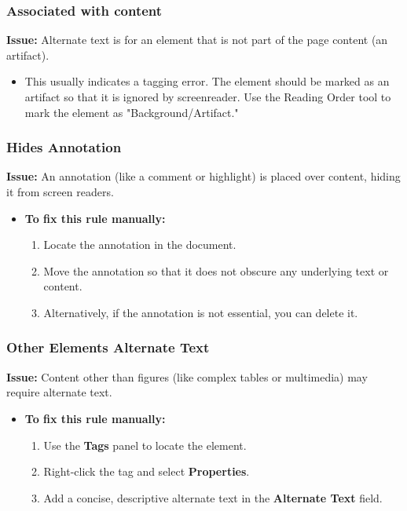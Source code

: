 \subsubsection{Associated with content}
\label{ssubsec:pdf-alt-text-associated}

\textbf{Issue:} Alternate text is for an element that is not part of the page content (an artifact).

\begin{itemize}
	\item This usually indicates a tagging error. The element should be marked as an artifact so that it is ignored by \gls{screenreader}. Use the Reading Order tool to mark the element as "Background/Artifact."
\end{itemize}

\subsubsection{Hides Annotation}
\label{ssubsec:pdf-hides-annotation}

\textbf{Issue:} An annotation (like a comment or highlight) is placed over content, hiding it from screen readers.

\begin{itemize}
	\item \textbf{To fix this rule manually:}
	      \begin{enumerate}
		      \item Locate the annotation in the document.
		      \item Move the annotation so that it does not obscure any underlying text or content.
		      \item Alternatively, if the annotation is not essential, you can delete it.
	      \end{enumerate}
\end{itemize}

\subsubsection{Other Elements Alternate Text}
\label{ssubsec:pdf-other-elements-alt-text}

\textbf{Issue:} Content other than figures (like complex tables or multimedia) may require alternate text.

\begin{itemize}
	\item \textbf{To fix this rule manually:}
	      \begin{enumerate}
		      \item Use the \textbf{Tags} panel to locate the element.
		      \item Right-click the tag and select \textbf{Properties}.
		      \item Add a concise, descriptive alternate text in the \textbf{Alternate Text} field.
	      \end{enumerate}
\end{itemize}

